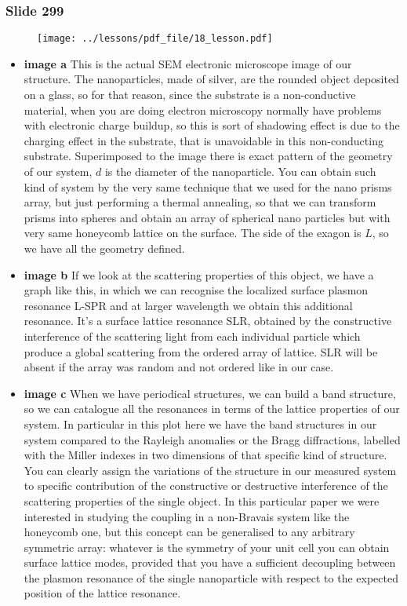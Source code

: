\documentclass[../main/main.tex]{subfiles}
\begin{document}
\newpage
\subsubsection{Slide 299}

\begin{figure}[h!]
\centering
\texttt{[image: ../lessons/pdf\_file/18\_lesson.pdf]}
\end{figure}

\begin{itemize} 
\item \textbf{image a} This is the actual SEM electronic microscope image of our structure. 
The nanoparticles, made of silver, are the rounded object deposited on a glass, so for that reason, since the substrate is a non-conductive material, when you are doing electron microscopy normally have problems with electronic charge buildup, so this is sort of shadowing effect is due to the charging effect in the substrate, that is unavoidable in this non-conducting substrate.
Superimposed to the image there is exact pattern of the geometry of our system, $d$ is the diameter of the nanoparticle. You can obtain such kind of system by the very same technique that we used for the nano prisms array, but just performing a thermal annealing, so that we can transform prisms into spheres and  obtain an array of spherical nano particles but with very same honeycomb lattice on the surface.
The side of the exagon is $L$, so we have all the geometry defined.
\item \textbf{image b}  If we look at the scattering properties of this object, we have a graph like this, in which we can recognise the localized surface plasmon resonance L-SPR and at larger wavelength we obtain this additional resonance. It’s a surface lattice resonance SLR, obtained by the constructive interference of the scattering light from each individual particle which produce a global scattering from the ordered array of lattice. SLR will be absent if the array was random and not ordered like in our case.

\item \textbf{image c}  When we have periodical structures, we can build a band structure, so we can catalogue all the resonances in terms of the lattice properties of our system. In particular in this plot here we have the band structures in our system compared to the Rayleigh anomalies or the Bragg diffractions, labelled with the Miller indexes in two dimensions of that specific kind of structure. You can clearly assign the variations of the structure in our measured system to specific contribution of the constructive or destructive interference of the scattering properties of the single object.
In this particular paper we were interested in studying the coupling in a non-Bravais system like the honeycomb one, but this concept can be generalised to any arbitrary symmetric array: whatever is the symmetry of your unit cell you can obtain surface lattice modes, provided that you have a sufficient decoupling between the plasmon resonance of the single nanoparticle with respect to the expected position of the lattice resonance.
\end{itemize}
\end{document}
